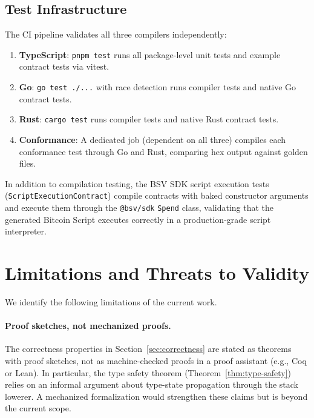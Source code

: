 \documentclass[11pt,a4paper]{article}
\begin{document}
\subsection{Test Infrastructure}
\label{sec:eval-infra}

The CI pipeline validates all three compilers independently:

\begin{enumerate}[nosep]
  \item \textbf{TypeScript}: \texttt{pnpm test} runs all package-level
    unit tests and example contract tests via vitest.
  \item \textbf{Go}: \texttt{go test ./...} with race detection runs
    compiler tests and native Go contract tests.
  \item \textbf{Rust}: \texttt{cargo test} runs compiler tests and
    native Rust contract tests.
  \item \textbf{Conformance}: A dedicated job (dependent on all three)
    compiles each conformance test through Go and Rust, comparing hex
    output against golden files.
\end{enumerate}

In addition to compilation testing, the BSV SDK script execution tests
(\texttt{ScriptExecutionContract}) compile contracts with baked constructor
arguments and execute them through the \texttt{@bsv/sdk} \texttt{Spend}
class, validating that the generated Bitcoin Script executes correctly in
a production-grade script interpreter.

\section{Limitations and Threats to Validity}
\label{sec:limitations}

We identify the following limitations of the current work.

\paragraph{Proof sketches, not mechanized proofs.}
The correctness properties in Section~\ref{sec:correctness} are stated as
theorems with proof sketches, not as machine-checked proofs in a proof
assistant (e.g., Coq or Lean). In particular, the type safety theorem
(Theorem~\ref{thm:type-safety}) relies on an informal argument about
type-state propagation through the stack lowerer. A mechanized
formalization would strengthen these claims but is beyond the current scope.
\end{document}

